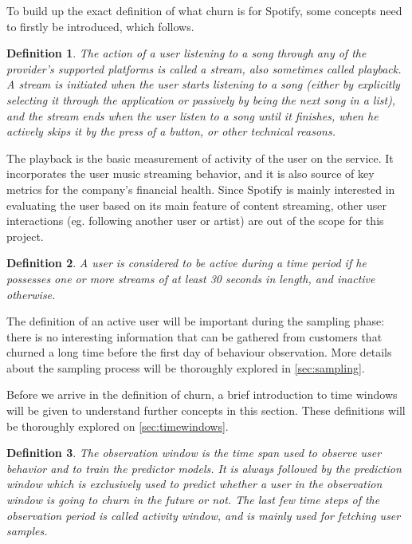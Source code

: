 \documentclass{kththesis}
\begin{document}
To build up the exact definition of what churn is for Spotify, some concepts need to firstly be introduced, which follows.

\newtheorem{definition}{Definition}

\begin{definition}
The action of a user listening to a song through any of the provider's supported platforms is called a \emph{stream}, also sometimes called \emph{playback}. A stream is initiated when the user starts listening to a song (either by explicitly selecting it through the application or passively by being the next song in a list), and the stream ends when the user listen to a song until it finishes, when he actively skips it by the press of a button, or other technical reasons.
\end{definition}

The playback is the basic measurement of activity of the user on the service. It incorporates the user music streaming behavior, and it is also source of key metrics for the company's financial health. Since Spotify is mainly interested in evaluating the user based on its main feature of content streaming, other user interactions (eg. following another user or artist) are out of the scope for this project. 

\begin{definition}
A user is considered to be \emph{active} during a time period if he possesses one or more streams of at least 30 seconds in length, and \emph{inactive} otherwise.
\end{definition}

The definition of an active user will be important during the sampling phase: there is no interesting information that can be gathered from customers that churned a long time before the first day of behaviour observation. More details about the sampling process will be thoroughly explored in \autoref{sec:sampling}.

Before we arrive in the definition of churn, a brief introduction to time windows will be given to understand further concepts in this section. These definitions will be thoroughly explored on \autoref{sec:timewindows}.

\begin{definition}
The \emph{observation window} is the time span used to observe user behavior and to train the predictor models. It is always followed by the \emph{prediction window} which is exclusively used to predict whether a user in the observation window is going to churn in the future or not. The last few time steps of the observation period is called \emph{activity window}, and is mainly used for fetching user samples.
\end{definition}
\end{document}

